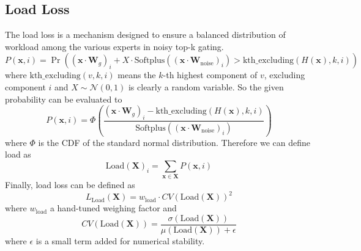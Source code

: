 \documentclass[12pt]{article}
\begin{document}
\subsection{Load Loss}
The load loss is a mechanism designed to ensure a balanced distribution of workload among the various experts in noisy top-k gating.
\begin{equation}
P(\mathbf{x}, i) = \Pr\left( (\mathbf{x} \cdot \mathbf{W}_g)_i + X \cdot \text{Softplus}((\mathbf{x} \cdot \mathbf{W}_{\text{noise}})_i) > \text{kth\_excluding}(H(\mathbf{x}), k, i)\right)
\end{equation}
where $\text{kth\_excluding}(v, k, i)$ means the $k$-th highest component of $v$, excluding component $i$ and $X\sim\mathcal{N}(0,1)$ is clearly a random variable. So the given probability can be evaluated to
\begin{equation}
P(\mathbf{x}, i) = \Phi\left( \frac{ (\mathbf{x} \cdot \mathbf{W}_g)_i - \text{kth\_excluding}(H(\mathbf{x}), k, i) }{\text{Softplus}((\mathbf{x} \cdot \mathbf{W}_{\text{noise}})_i)} \right)
\end{equation}
where $\Phi$ is the CDF of the standard normal distribution. Therefore we can define load as
\begin{equation}
\text{Load}(\mathbf{X})_i = \sum_{\mathbf{x} \in \mathbf{X}} P(\mathbf{x}, i)
\end{equation}
Finally, load loss can be defined as
\begin{equation}
L_{\text{Load}}(\mathbf{X}) = w_{\text{load}} \cdot CV(\text{Load}(\mathbf{X}))^2
\end{equation}
where $w_{\text{load}}$ a hand-tuned weighing factor and 
\begin{equation}
CV(\text{Load}(\mathbf{X})) = \frac{\sigma(\text{Load}(\mathbf{X}))}{\mu(\text{Load}(\mathbf{X}))+\epsilon}
\end{equation}
where $\epsilon$ is a small term added for numerical stability.
\end{document}
